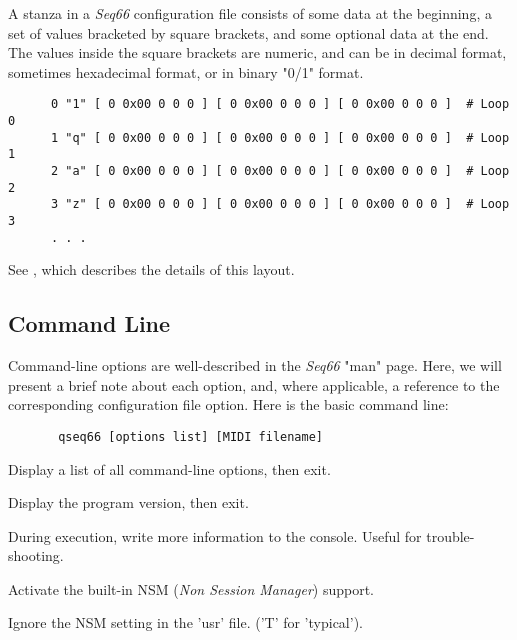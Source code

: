   A stanza in a \textsl{Seq66} configuration file consists of some data at the
   beginning, a set of values bracketed by square brackets, and some optional
   data at the end.  The values inside the square brackets are numeric, and can
   be in decimal format, sometimes hexadecimal format, or in binary "0/1"
   format.

   \begin{verbatim}
      0 "1" [ 0 0x00 0 0 0 ] [ 0 0x00 0 0 0 ] [ 0 0x00 0 0 0 ]  # Loop 0
      1 "q" [ 0 0x00 0 0 0 ] [ 0 0x00 0 0 0 ] [ 0 0x00 0 0 0 ]  # Loop 1
      2 "a" [ 0 0x00 0 0 0 ] [ 0 0x00 0 0 0 ] [ 0 0x00 0 0 0 ]  # Loop 2
      3 "z" [ 0 0x00 0 0 0 ] [ 0 0x00 0 0 0 ] [ 0 0x00 0 0 0 ]  # Loop 3
      . . .
   \end{verbatim}

   See , which describes
   the details of this layout.

\subsection{Command Line}
\label{subsec:configuration_command_line}

   Command-line options are well-described in the \textsl{Seq66} "man" page.
   Here, we will present a brief note about each option, and, where applicable, a
   reference to the corresponding configuration file option.
   Here is the basic command line:

   \begin{verbatim}
       qseq66 [options list] [MIDI filename]
   \end{verbatim}

      Display a list of all command-line options, then exit.

      Display the program version, then exit.

      During execution, write more information to the console.  Useful for
      trouble-shooting.
   

      Activate the built-in NSM (\textsl{Non Session Manager}) support.

      Ignore the NSM setting in the 'usr' file. ('T' for 'typical').

